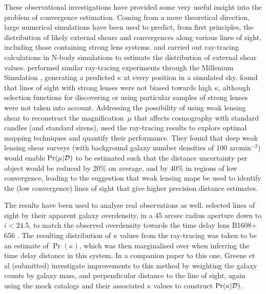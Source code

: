 \documentclass[useAMS,usenatbib]{mn2e}
\begin{document}
These observational investigations have provided some very useful
insight into the problem of convergence estimation.  Coming from a more
theoretical direction, large numerical simulations have been used to
predict, from first principles, the distribution of likely external
shears and convergences along various lines of sight, including those
containing strong lens systems.  \citet{Holder+Schechter2003} and
\citet{DalalEtal2005} carried out ray-tracing calculations in N-body
simulations to estimate the distribution of external shear values. 
\citet{HilbertEtal2009} performed similar ray-tracing experiments
through the Millenium Simulation \citep{SpringelEtal2005}, generating a
predicted $\kappa$ at every position in a simulated sky.
\citet{HilbertEtal2009} found that \MS lines of sight with strong lenses
were not biased towards high $\kappa$, although selection functions for
discovering or using particular samples of strong lenses were not taken
into account. Addressing the possibility of using weak lensing shear to
reconstruct the magnification~$\mu$ that affects cosmography with
standard candles (and standard sirens), \citet{HilbertEtal2011} used the
\MS ray-tracing results to explore optimal mapping techniques and
quantify their performance. They found that deep weak lensing shear
surveys (with background galaxy number densities of 100 arcmin$^{-2}$)
would enable $\Pr(\mu|{\mathcal{D}})$ to be estimated such that the distance
uncertainty per object would be reduced by  20\% on average, and by 40\%
in regions of low convergence, leading to the suggestion that weak
lensing maps be used to identify the (low convergence)  lines of sight
that give higher precision distance estimates.

The \MS results have been used to analyse real observations as well. 
\citet{SuyuEtal2010} selected \MS lines of sight by their apparent
galaxy overdensity, in a 45 arcsec radius aperture down to $i < 24.5$,
to match the observed overdensity towards the time delay lens
B1608$+$656 \citep{FassnachtEtal2011}.  The resulting distribution of
$\kappa$ values from the ray-tracing was taken to be an estimate of 
$\Pr(\kappa)$, which was then marginalised over when inferring the time
delay distance in this system. 
In a companion paper to this one, Greene et al (submitted) investigate
improvements to this method by weighting the galaxy counts by galaxy
mass, and perpendicular distance to the line of sight, again using the
\MS mock catalogs and their associated $\kappa$ values to construct
$\Pr(\kappa|{\mathcal{D}})$.
\end{document}
